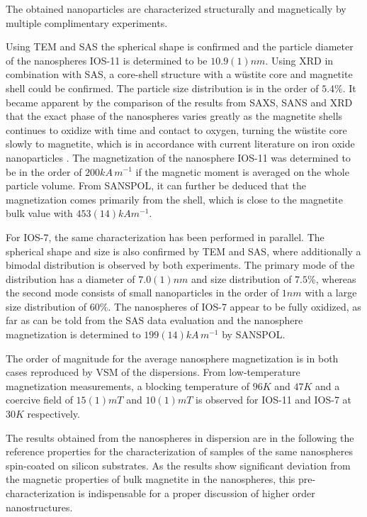 \documentclass[\main/dresen_thesis.tex]{subfiles}
\begin{document}
  \label{sec:looselyPackedNS:nanoparticle:discussion:summary}
  The obtained nanoparticles are characterized structurally and magnetically by multiple complimentary experiments.

  Using TEM and SAS the spherical shape is confirmed and the particle diameter of the nanospheres IOS-11 is determined to be $10.9(1) \unit{nm}$.
  Using XRD in combination with SAS, a core-shell structure with a w\"ustite core and magnetite shell could be confirmed.
  The particle size distribution is in the order of $5.4 \unit{\%}$.
  It became apparent by the comparison of the results from SAXS, SANS and XRD that the exact phase of the nanospheres varies greatly as the magnetite shells continues to oxidize with time and contact to oxygen, turning the w\"ustite core slowly to magnetite, which is in accordance with current literature on iron oxide nanoparticles .
  The magnetization of the nanosphere IOS-11 was determined to be in the order of $200 \unit{kA \, m^{-1}}$ if the magnetic moment is averaged on the whole particle volume.
  From SANSPOL, it can further be deduced that the magnetization comes primarily from the shell, which is close to the magnetite bulk value with $453(14) \unit{kA m^{-1}}$.

  For IOS-7, the same characterization has been performed in parallel.
  The spherical shape and size is also confirmed by TEM and SAS, where additionally a bimodal distribution is observed by both experiments.
  The primary mode of the distribution has a diameter of $7.0(1) \unit{nm}$ and size distribution of $7.5 \unit{\%}$, whereas the second mode consists of small nanoparticles in the order of $1 \unit{nm}$ with a large size distribution of $60 \%$.
  The nanospheres of IOS-7 appear to be fully oxidized, as far as can be told from the SAS data evaluation and the nanosphere magnetization is determined to $199(14) \unit{kA \, m^{-1}}$ by SANSPOL.

  The order of magnitude for the average nanosphere magnetization is in both cases reproduced by VSM of the dispersions.
  From low-temperature magnetization measurements, a blocking temperature of $96 \unit{K}$ and $47 \unit{K}$ and a coercive field of $15(1) \unit{mT}$ and $10(1) \unit{mT}$ is observed for IOS-11 and IOS-7 at $30 \unit{K}$ respectively.

  The results obtained from the nanospheres in dispersion are in the following the reference properties for the characterization of samples of the same nanospheres spin-coated on silicon substrates.
  As the results show significant deviation from the magnetic properties of bulk magnetite in the nanospheres, this pre-characterization is indispensable for a proper discussion of higher order nanostructures.
\end{document}
